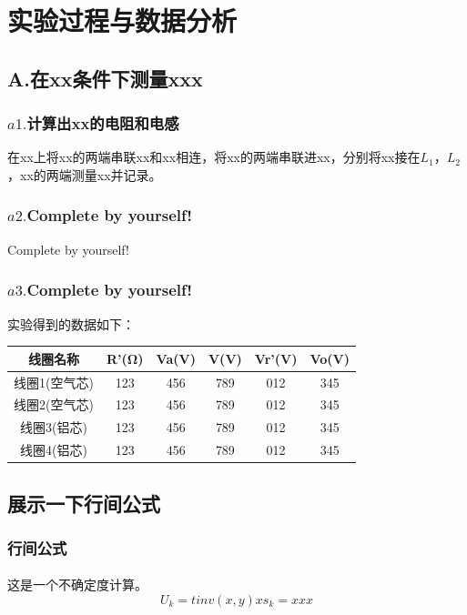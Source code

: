 \documentclass[UTF8]{ctexart}
\begin{document}
\section{实验过程与数据分析}
\subsection{A.在xx条件下测量xxx}
\subsubsection{$a1. $计算出xx的电阻和电感}
在xx上将xx的两端串联xx和xx相连，将xx的两端串联进xx，分别将xx接在$L_1$，$L_2$，xx的两端测量xx并记录。
\subsubsection{$a2. $Complete by yourself!}
Complete by yourself!
\subsubsection{$a3. $Complete by yourself!}
实验得到的数据如下：

\begin{center}
\begin{tabular}{|c|c|c|c|c|c|}
 \hline
线圈名称 & R'(Ω) & Va(V) & V(V) & Vr'(V) & Vo(V)\\
 \hline
线圈1(空气芯) & 123 & 456 & 789 & 012 & 345\\
 \hline
线圈2(空气芯) & 123 & 456 & 789 & 012 & 345\\
 \hline
线圈3(铝芯) & 123 & 456 & 789 & 012 & 345\\
 \hline
线圈4(铝芯) & 123 & 456 & 789 & 012 & 345\\
 \hline
\end{tabular}
\end{center}

\subsection{展示一下行间公式}
\subsubsection{行间公式}
\paragraph{}这是一个不确定度计算。
\[
U_k=tinv(x,y)xs_k=xxx
\]
\end{document}
